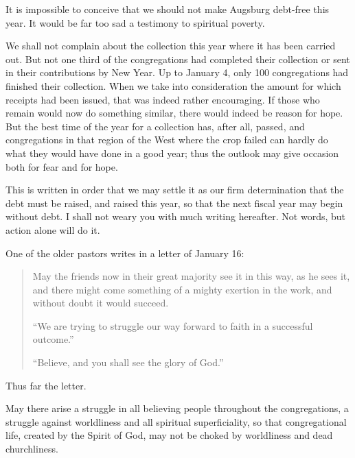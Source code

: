 It is impossible to conceive that we should not make Augsburg debt-free this year. It would be far too sad a testimony to spiritual poverty.

We shall not complain about the collection this year where it has been carried out. But not one third of the congregations had completed their collection or sent in their contributions by New Year. Up to January 4, only 100 congregations had finished their collection. When we take into consideration the amount for which receipts had been issued, that was indeed rather encouraging. If those who remain would now do something similar, there would indeed be reason for hope. But the best time of the year for a collection has, after all, passed, and congregations in that region of the West where the crop failed can hardly do what they would have done in a good year; thus the outlook may give occasion both for fear and for hope.

This is written in order that we may settle it as our firm determination that the debt must be raised, and raised this year, so that the next fiscal year may begin without debt. I shall not weary you with much writing hereafter. Not words, but action alone will do it.

One of the older pastors writes in a letter of January 16:

\begin{quote}May the friends now in their great majority see it in this way, as he sees it, and there might come something of a mighty exertion in the work, and without doubt it would succeed.

“We are trying to struggle our way forward to faith in a successful outcome.”

“Believe, and you shall see the glory of God.”

\end{quote}

Thus far the letter.

May there arise a struggle in all believing people throughout the congregations, a struggle against worldliness and all spiritual superficiality, so that congregational life, created by the Spirit of God, may not be choked by worldliness and dead churchliness.